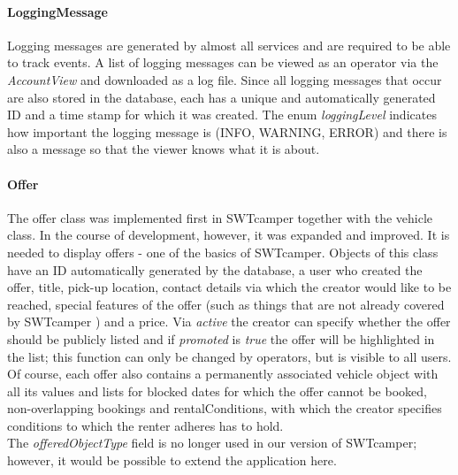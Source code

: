 \paragraph{LoggingMessage}
Logging messages are generated by almost all services and are required to be able to track events. A list of logging messages can be viewed as an operator via the \textit{AccountView} and downloaded as a log file. Since all logging messages that occur are also stored in the database, each has a unique and automatically generated ID and a time stamp for which it was created. The enum \textit{loggingLevel} indicates how important the logging message is (INFO, WARNING, ERROR) and there is also a message so that the viewer knows what it is about.

\paragraph{Offer}
The offer class was implemented first in SWTcamper together with the vehicle class. In the course of development, however, it was expanded and improved. It is needed to display offers - one of the basics of SWTcamper. Objects of this class have an ID automatically generated by the database, a user who created the offer, title, pick-up location, contact details via which the creator would like to be reached, special features of the offer (such as things that are not already covered by SWTcamper ) and a price. Via \textit{active} the creator can specify whether the offer should be publicly listed and if \textit{promoted} is \textit{true} the offer will be highlighted in the list; this function can only be changed by operators, but is visible to all users. Of course, each offer also contains a permanently associated vehicle object with all its values and lists for blocked dates for which the offer cannot be booked, non-overlapping bookings and rentalConditions, with which the creator specifies conditions to which the renter adheres has to hold. \\
The \textit{offeredObjectType} field is no longer used in our version of SWTcamper; however, it would be possible to extend the application here.


